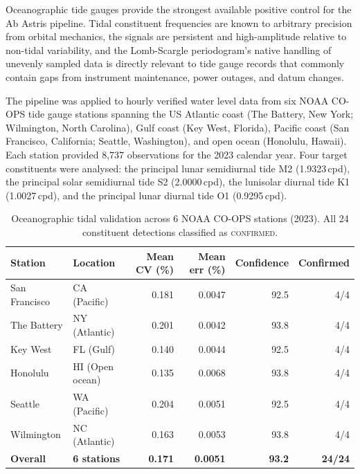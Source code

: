 \documentclass[11pt,a4paper]{article}
\begin{document}
Oceanographic tide gauges provide the strongest available positive control for the Ab Astris pipeline. Tidal constituent frequencies are known to arbitrary precision from orbital mechanics, the signals are persistent and high-amplitude relative to non-tidal variability, and the Lomb-Scargle periodogram's native handling of unevenly sampled data is directly relevant to tide gauge records that commonly contain gaps from instrument maintenance, power outages, and datum changes.

The pipeline was applied to hourly verified water level data from six NOAA CO-OPS tide gauge stations spanning the US Atlantic coast (The Battery, New York; Wilmington, North Carolina), Gulf coast (Key West, Florida), Pacific coast (San Francisco, California; Seattle, Washington), and open ocean (Honolulu, Hawaii). Each station provided 8{,}737 observations for the 2023 calendar year. Four target constituents were analysed: the principal lunar semidiurnal tide M2 (1.9323\,cpd), the principal solar semidiurnal tide S2 (2.0000\,cpd), the lunisolar diurnal tide K1 (1.0027\,cpd), and the principal lunar diurnal tide O1 (0.9295\,cpd).

\begin{table}[htbp]
\centering
\caption{Oceanographic tidal validation across 6 NOAA CO-OPS stations (2023). All 24 constituent detections classified as \textsc{confirmed}.}
\label{tab:tidal}
\smallskip
\small
\begin{tabular}{llrrrr}
\toprule
\textbf{Station} & \textbf{Location} & \textbf{Mean CV (\%)} & \textbf{Mean err (\%)} & \textbf{Confidence} & \textbf{Confirmed} \\
\midrule
San Francisco & CA (Pacific)     & 0.181 & 0.0047 & 92.5 & 4/4 \\
The Battery   & NY (Atlantic)    & 0.201 & 0.0042 & 93.8 & 4/4 \\
Key West      & FL (Gulf)        & 0.140 & 0.0044 & 92.5 & 4/4 \\
Honolulu      & HI (Open ocean)  & 0.135 & 0.0068 & 93.8 & 4/4 \\
Seattle       & WA (Pacific)     & 0.204 & 0.0051 & 92.5 & 4/4 \\
Wilmington    & NC (Atlantic)    & 0.163 & 0.0053 & 93.8 & 4/4 \\
\midrule
\textbf{Overall} & \textbf{6 stations} & \textbf{0.171} & \textbf{0.0051} & \textbf{93.2} & \textbf{24/24} \\
\bottomrule
\end{tabular}
\end{table}
\end{document}
